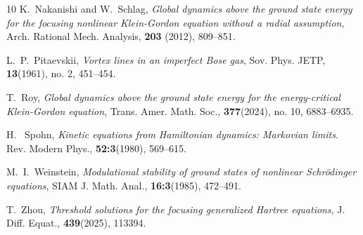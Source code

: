 \documentclass[reqno, 11pt]{amsart}
\numberwithin{equation}{section}
\theoremstyle{plain}
\theoremstyle{definition}
\numberwithin{equation}{section}
\numberwithin{theorem}{section}
\numberwithin{equation}{section}
\numberwithin{equation}{section}
\numberwithin{theorem}{section}
\begin{document}
\begin{thebibliography}{10}
		K.~Nakanishi and W.~Schlag, \emph{Global dynamics above the ground state energy for the focusing nonlinear Klein-Gordon equation without a radial assumption}, Arch. Rational Mech. Analysis, \textbf{203} (2012), 809--851.
		
		L.~P.~Pitaevskii, \emph{Vortex lines in an imperfect Bose gas}, Sov. Phys. JETP, \textbf{13}(1961), no. 2, 451--454. 
		
		T.~Roy, \emph{Global dynamics above the ground state energy for the energy-critical Klein-Gordon equation}, Trans. Amer. Math. Soc., \textbf{377}(2024), no. 10,  6883--6935.
		
		H. ~Spohn, \emph{Kinetic equations from Hamiltonian dynamics: Markovian limits}. Rev. Modern Phys., \textbf{52:3}(1980), 569--615.
		
		M.~I.~Weinstein,  \emph{Modulational stability of ground states of nonlinear Schr\"{o}dinger equations}, SIAM J.	Math. Anal., \textbf{16:3}(1985), 472--491.
		
		T.~Zhou, \emph{Threshold solutions for the focusing generalized Hartree equations}, J. Diff. Equat., \textbf{439}(2025), 113394.
	\end{thebibliography}
	
\end{document}
